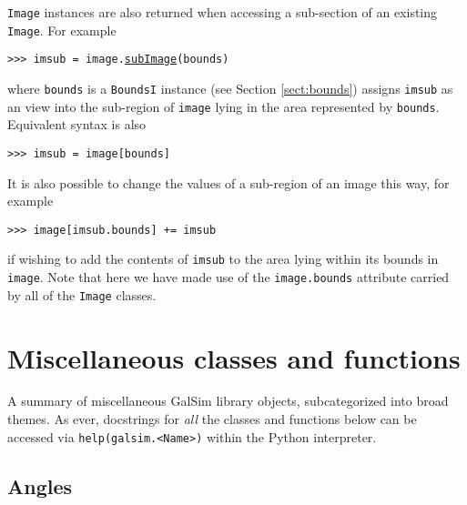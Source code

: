 \documentclass[preprint,10pt]{../../devel/modules/aastex}
\begin{document}
\texttt{Image} instances are also returned when
accessing a sub-section of an existing \texttt{Image}.  For example

\texttt{>>> imsub = image.\href{http://galsim-developers.github.io/GalSim/classgalsim_1_1image_1_1_image.html\#a968b8dce7fb7155a09fe44c064a285aa}{subImage}(bounds)}

where \texttt{bounds} is a \texttt{BoundsI} instance (see Section
\ref{sect:bounds}) assigns \texttt{imsub} as an view into
the sub-region of \texttt{image} lying in the area represented by
\texttt{bounds}.  Equivalent syntax is also

\texttt{>>> imsub = image[bounds]}

It is also possible to change the values of a sub-region of an image
this way, for example

\texttt{>>> image[imsub.bounds] += imsub}

if wishing to add the contents of \texttt{imsub} to the area lying
within its bounds in \texttt{image}.  Note that here we have made use of
the \texttt{image.bounds} attribute carried by all of the \texttt{Image}
classes.

\section{Miscellaneous classes and functions}\label{sect:misc}

A summary of miscellaneous GalSim library objects, subcategorized into
broad themes.  As ever, docstrings for \emph{all} the classes and
functions below can be accessed via \texttt{help(galsim.<Name>)}
within the Python interpreter.

\subsection{Angles}\label{sect:angles}
\end{document}
